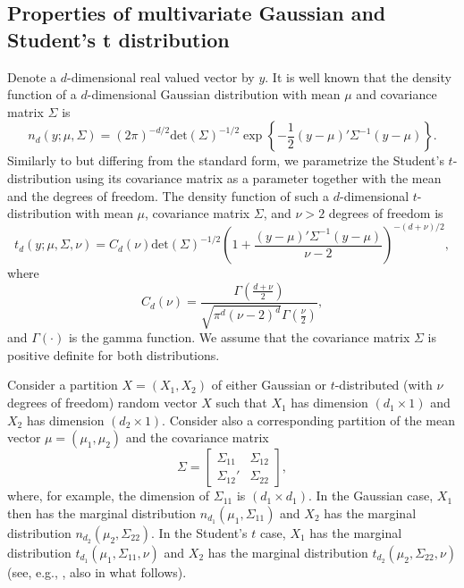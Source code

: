 \documentclass[nojss]{jss}
\begin{document}
\begin{appendix}
\section{Properties of multivariate Gaussian and Student's t distribution}\label{ap:propt}

Denote a $d$-dimensional real valued vector by $y$.  It is well known that the density function of a $d$-dimensional Gaussian distribution with mean $\mu$ and covariance matrix $\Sigma$ is
\begin{equation}
n_d(y;\mu,\Sigma) = (2\pi)^{-d/2}\text{det}(\Sigma)^{-1/2}\exp\left\lbrace -\frac{1}{2}(y -\mu)'\Sigma^{-1}(y - \mu) \right\rbrace .
\end{equation}
Similarly to \cite{Meitz+Preve+Saikkonen:2021} but differing from the standard form, we parametrize the Student's $t$-distribution using its covariance matrix as a parameter together with the mean and the degrees of freedom. The density function of such a $d$-dimensional $t$-distribution with mean $\mu$, covariance matrix $\Sigma$, and $\nu>2$ degrees of freedom is
\begin{equation}
t_d(y;\mu,\Sigma,\nu)=C_d(\nu)\text{det}(\Sigma)^{-1/2}\left(1+\frac{(y -\mu)'\Sigma^{-1}(y - \mu)}{\nu-2}\right)^{-(d+\nu)/2},
\end{equation}
where
\begin{equation}
C_d(\nu)=\frac{\Gamma\left(\frac{d+\nu}{2}\right)}{\sqrt{\pi^d(\nu-2)^d}\Gamma\left(\frac{\nu}{2}\right)},
\end{equation}
and $\Gamma\left(\cdot\right)$ is the gamma function.  We assume that the covariance matrix $\Sigma$ is positive definite for both distributions.

Consider a partition $X=(X_1,X_2)$ of either Gaussian or $t$-distributed (with $\nu$ degrees of freedom) random vector $X$ such that $X_1$ has dimension $(d_1\times1)$ and $X_2$ has dimension $(d_2\times1)$. Consider also a corresponding partition of the mean vector $\mu=(\mu_1,\mu_2)$ and the covariance matrix
\begin{equation}
\Sigma=
\begin{bmatrix}
\Sigma_{11} & \Sigma_{12} \\
\Sigma_{12}' & \Sigma_{22}
\end{bmatrix},
\end{equation}
where, for example, the dimension of $\Sigma_{11}$ is $(d_1\times d_1)$.  In the Gaussian case, $X_1$ then has the marginal distribution $n_{d_1}(\mu_1,\Sigma_{11})$ and $X_2$ has the marginal distribution $n_{d_2}(\mu_2,\Sigma_{22})$.  In the Student's $t$ case,  $X_1$ has the marginal distribution $t_{d_1}(\mu_1,\Sigma_{11},\nu)$ and $X_2$ has the marginal distribution $t_{d_2}(\mu_2,\Sigma_{22},\nu)$ (see, e.g., \cite{Ding:2016}, also in what follows).


\end{appendix}
\end{document}
